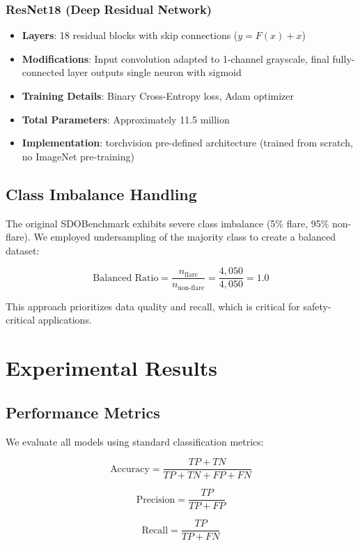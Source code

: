\documentclass[11pt,a4paper]{article}
\begin{document}
\subsubsection{ResNet18 (Deep Residual Network)}

\begin{itemize}
    \item \textbf{Layers}: 18 residual blocks with skip connections (\(y = F(x) + x\))
    \item \textbf{Modifications}: Input convolution adapted to 1-channel grayscale, final fully-connected layer outputs single neuron with sigmoid
    \item \textbf{Training Details}: Binary Cross-Entropy loss, Adam optimizer
    \item \textbf{Total Parameters}: Approximately 11.5 million
    \item \textbf{Implementation}: torchvision pre-defined architecture (trained from scratch, no ImageNet pre-training)
\end{itemize}

\subsection{Class Imbalance Handling}

The original SDOBenchmark exhibits severe class imbalance (5\% flare, 95\% non-flare). We employed undersampling of the majority class to create a balanced dataset:

\[
\text{Balanced Ratio} = \frac{n_{\text{flare}}}{n_{\text{non-flare}}} = \frac{4,050}{4,050} = 1.0
\]

This approach prioritizes data quality and recall, which is critical for safety-critical applications.

\section{Experimental Results}

\subsection{Performance Metrics}

We evaluate all models using standard classification metrics:

\[
\text{Accuracy} = \frac{TP + TN}{TP + TN + FP + FN}
\]

\[
\text{Precision} = \frac{TP}{TP + FP}
\]

\[
\text{Recall} = \frac{TP}{TP + FN}
\]
\end{document}
